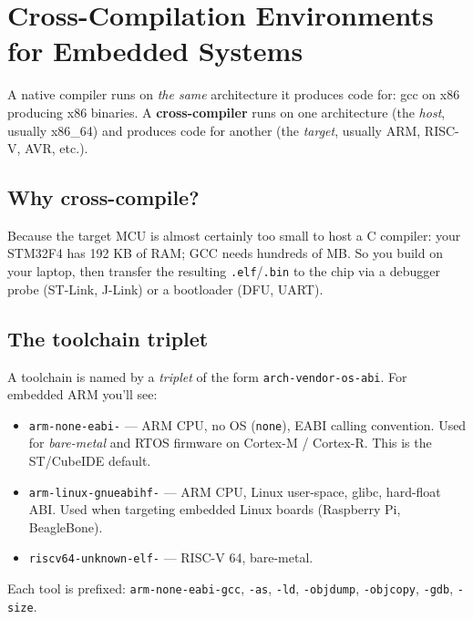 \documentclass[11pt,a4paper]{article}
\begin{document}
\section{Cross-Compilation Environments for Embedded Systems}

A native compiler runs on \emph{the same} architecture it produces code for:
gcc on x86 producing x86 binaries. A \textbf{cross-compiler} runs on one
architecture (the \emph{host}, usually x86\_64) and produces code for another
(the \emph{target}, usually ARM, RISC-V, AVR, etc.).

\subsection{Why cross-compile?}

Because the target MCU is almost certainly too small to host a C compiler:
your STM32F4 has 192 KB of RAM; GCC needs hundreds of MB. So you build on
your laptop, then transfer the resulting \texttt{.elf}/\texttt{.bin} to the
chip via a debugger probe (ST-Link, J-Link) or a bootloader (DFU, UART).

\subsection{The toolchain triplet}

A toolchain is named by a \emph{triplet} of the form
\texttt{arch-vendor-os-abi}. For embedded ARM you'll see:

\begin{itemize}[leftmargin=*]
    \item \texttt{arm-none-eabi-} --- ARM CPU, no OS (\texttt{none}),
    EABI calling convention. Used for \emph{bare-metal} and RTOS firmware on
    Cortex-M / Cortex-R. This is the ST/CubeIDE default.
    \item \texttt{arm-linux-gnueabihf-} --- ARM CPU, Linux user-space,
    glibc, hard-float ABI. Used when targeting embedded Linux boards
    (Raspberry Pi, BeagleBone).
    \item \texttt{riscv64-unknown-elf-} --- RISC-V 64, bare-metal.
\end{itemize}

Each tool is prefixed: \texttt{arm-none-eabi-gcc}, \texttt{-as}, \texttt{-ld},
\texttt{-objdump}, \texttt{-objcopy}, \texttt{-gdb}, \texttt{-size}.
\end{document}
